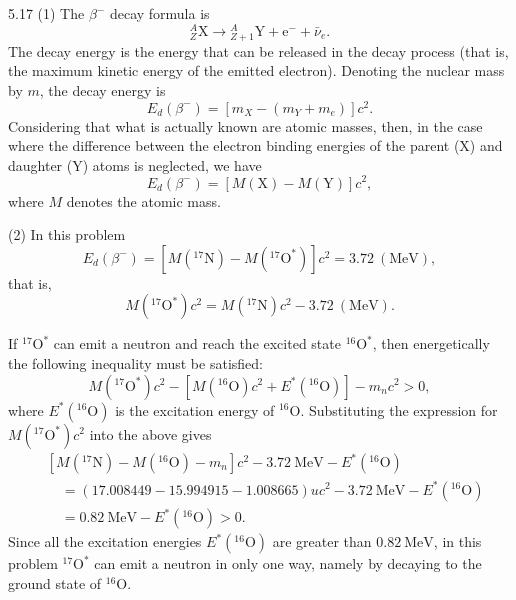\begin{solution}{5.17}
(1) The $\beta^-$ decay formula is
\begin{equation*}
{}_{Z}^{A}\mathrm{X}\to{}_{Z+1}^{A}\mathrm{Y}+\mathrm{e}^-+\bar{\nu}_e.
\end{equation*}
The decay energy is the energy that can be released in the decay process (that is, the maximum
kinetic energy of the emitted electron). Denoting the nuclear mass by $m$, the decay energy is
\begin{equation*}
E_d(\beta^-)=\left[m_X-(m_Y+m_e)\right]c^2.
\end{equation*}
Considering that what is actually known are atomic masses, then, in the case where the
difference between the electron binding energies of the parent (X) and daughter (Y) atoms is
neglected, we have
\begin{equation*}
E_d(\beta^-)=\left[M(\mathrm{X})-M(\mathrm{Y})\right]c^2,
\end{equation*}
where $M$ denotes the atomic mass.

(2) In this problem
\begin{equation*}
E_d(\beta^-)=\left[M({}^{17}\mathrm{N})-M({}^{17}\mathrm{O}^*)\right]c^2=3.72\ (\mathrm{MeV}),
\end{equation*}
that is,
\begin{equation*}
M({}^{17}\mathrm{O}^*)c^2=M({}^{17}\mathrm{N})c^2-3.72\ (\mathrm{MeV}).
\end{equation*}

If ${}^{17}\mathrm{O}^*$ can emit a neutron and reach the excited state ${}^{16}\mathrm{O}^*$,
then energetically the following inequality must be satisfied:
\begin{equation*}
M({}^{17}\mathrm{O}^*)c^2-\left[M({}^{16}\mathrm{O})c^2+E^*({}^{16}\mathrm{O})\right]-m_nc^2>0,
\end{equation*}
where $E^*({}^{16}\mathrm{O})$ is the excitation energy of ${}^{16}\mathrm{O}$. Substituting the
expression for $M({}^{17}\mathrm{O}^*)c^2$ into the above gives
\begin{align*}
&\left[M({}^{17}\mathrm{N})-M({}^{16}\mathrm{O})-m_n\right]c^2-3.72\ \mathrm{MeV}-E^*({}^{16}\mathrm{O})\\
&\quad=(17.008449-15.994915-1.008665)uc^2-3.72\ \mathrm{MeV}-E^*({}^{16}\mathrm{O})\\
&\quad=0.82\ \mathrm{MeV}-E^*({}^{16}\mathrm{O})>0.
\end{align*}
Since all the excitation energies $E^*({}^{16}\mathrm{O})$ are greater than $0.82\ \mathrm{MeV}$,
in this problem ${}^{17}\mathrm{O}^*$ can emit a neutron in only one way, namely by decaying to
the ground state of ${}^{16}\mathrm{O}$.


\end{solution}
